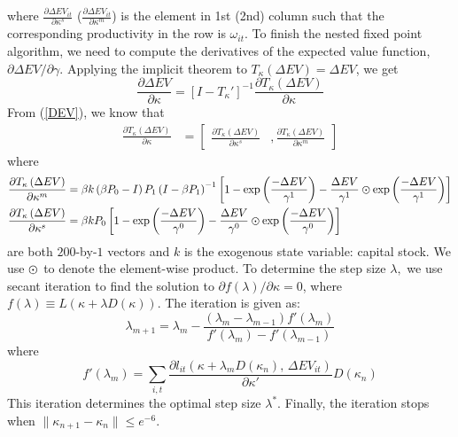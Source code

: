 \documentclass[11pt]{article}
\begin{document}
where $\frac{\partial\Delta EV_{it}}{\partial\kappa^{s}}$ ($\frac{\partial\Delta EV_{it}}{\partial\kappa^{m}}$)
is the element in 1st (2nd) column such that the corresponding productivity
in the row is $\omega_{it}$. To finish the nested fixed point algorithm,
we need to compute the derivatives of the expected value function,
$\partial\Delta EV/\partial\gamma$. Applying the implicit theorem
to $T_{\kappa}\left(\Delta EV\right)=\Delta EV$, we get 
\[
\frac{\partial\Delta EV}{\partial\kappa}=\left[I-T_{\kappa}'\right]^{-1}\frac{\partial T_{\kappa}\left(\Delta EV\right)}{\partial\kappa}
\]
From (\ref{DEV}), we know that 
\begin{align*}
\frac{\partial T_{\kappa}\left(\Delta EV\right)}{\partial\kappa} & =\left[\begin{array}{cc}
\frac{\partial T_{\kappa}\left(\Delta EV\right)}{\partial\kappa^{s}} & ,\frac{\partial T_{\kappa}\left(\Delta EV\right)}{\partial\kappa^{m}}\end{array}\right]
\end{align*}
where 
\begin{align*}
\frac{\partial T_{\kappa}\left(\Delta EV\right)}{\partial\kappa^{m}} & =\beta k\left(\beta P_{0}-I\right)P_{1}\left(I-\beta P_{1}\right)^{-1}\left[1-\exp\left(\frac{-\Delta EV}{\gamma^{1}}\right)-\frac{\Delta EV}{\gamma^{1}}\varodot\exp\left(\frac{-\Delta EV}{\gamma^{1}}\right)\right]\\ 
\frac{\partial T_{\kappa}\left(\Delta EV\right)}{\partial\kappa^{s}} & =\beta kP_{0}\left[1-\exp\left(\frac{-\Delta EV}{\gamma^{0}}\right)-\frac{\Delta EV}{\gamma^{0}}\varodot\exp\left(\frac{-\Delta EV}{\gamma^{0}}\right)\right]
\end{align*}
are both $200$-by-$1$ vectors and $k$ is the exogenous state variable:
capital stock. We use $\varodot$ to denote the element-wise product.
To determine the step size $\lambda,$ we use secant iteration to
find the solution to $\partial f\left(\lambda\right)/\partial\kappa=0$,
where $f\left(\lambda\right)\equiv L\left(\kappa+\lambda D\left(\kappa\right)\right)$.
The iteration is given as:
\begin{equation}
\lambda_{m+1}=\lambda_{m}-\frac{\left(\lambda_{m}-\lambda_{m-1}\right)f'\left(\lambda_{m}\right)}{f'\left(\lambda_{m}\right)-f'\left(\lambda_{m-1}\right)}
\end{equation}
where 
\begin{equation}
f'\left(\lambda_{m}\right)=\sum_{i,t}\frac{\partial l_{it}\left(\kappa+\lambda_{m}D\left(\kappa_{n}\right),\,\Delta EV_{it}\right)}{\partial\kappa'}D\left(\kappa_{n}\right)
\end{equation}
This iteration determines the optimal step size $\lambda^{*}$. Finally,
the iteration stops when $\|\kappa_{n+1}-\kappa_{n}\|\leq e^{-6}$. 
\end{document}
